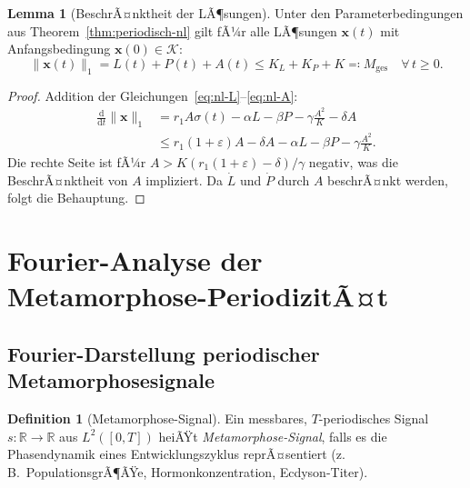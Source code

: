 ﻿\documentclass[12pt, a4paper]{article}
\theoremstyle{definition}
\newtheorem{lemma}[theorem]{Lemma}
\newtheorem{definition}[theorem]{Definition}
\newcommand{\R}{\mathbb{R}}
\newcommand{\dd}{\mathrm{d}}
\begin{document}
\begin{lemma}[BeschrÃ¤nktheit der LÃ¶sungen]\label{lem:beschraenkt}
Unter den Parameterbedingungen aus Theorem~\ref{thm:periodisch-nl} gilt fÃ¼r
alle LÃ¶sungen $\bm{x}(t)$ mit Anfangsbedingung $\bm{x}(0) \in \mathcal{K}$:
\[
  \|\bm{x}(t)\|_1 = L(t) + P(t) + A(t) \leq K_L + K_P + K \eqqcolon M_{\text{ges}}
  \quad \forall\, t \geq 0.
\]
\end{lemma}

\begin{proof}
Addition der Gleichungen~\eqref{eq:nl-L}--\eqref{eq:nl-A}:
\begin{align*}
  \frac{\dd}{\dd t}\|\bm{x}\|_1 &= r_1 A\sigma(t) - \alpha L - \beta P
  - \gamma\frac{A^2}{K} - \delta A \\
  &\leq r_1(1+\varepsilon) A - \delta A - \alpha L - \beta P
  - \gamma\frac{A^2}{K}.
\end{align*}
Die rechte Seite ist fÃ¼r $A > K(r_1(1+\varepsilon) - \delta)/\gamma$ negativ, was
die BeschrÃ¤nktheit von $A$ impliziert. Da $\dot{L}$ und $\dot{P}$ durch $A$
beschrÃ¤nkt werden, folgt die Behauptung. \hfill
\end{proof}

\section{Fourier-Analyse der Metamorphose-PeriodizitÃ¤t}

\subsection{Fourier-Darstellung periodischer Metamorphosesignale}

\begin{definition}[Metamorphose-Signal]\label{def:signal}
Ein messbares, $T$-periodisches Signal $s: \R \to \R$ aus $L^2([0,T])$
heiÃŸt \emph{Metamorphose-Signal}, falls es die Phasendynamik eines
Entwicklungszyklus reprÃ¤sentiert (z.\,B.\ PopulationsgrÃ¶ÃŸe, Hormonkonzentration,
Ecdyson-Titer).
\end{definition}
\end{document}
